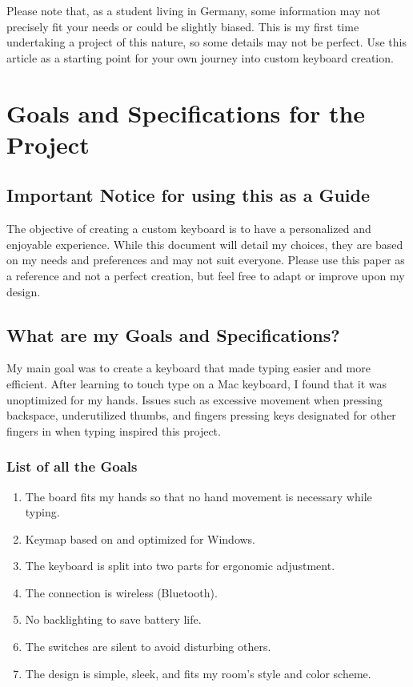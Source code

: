 \documentclass[a4paper,12pt]{article}
\begin{document}
Please note that, as a student living in Germany, some information may not precisely fit your needs or could be slightly biased. This is my first time undertaking a project of this nature, so some details may not be perfect. Use this article as a starting point for your own journey into custom keyboard creation.

\pagebreak

\section{Goals and Specifications for the Project}

\subsection{Important Notice for using this as a Guide}
The objective of creating a custom keyboard is to have a personalized and enjoyable experience. While this document will detail my choices, they are based on my needs and preferences and may not suit everyone. Please use this paper as a reference and not a perfect creation, but feel free to adapt or improve upon my design.

\subsection{What are my Goals and Specifications?}
My main goal was to create a keyboard that made typing easier and more efficient. After learning to touch type on a Mac keyboard, I found that it was unoptimized for my hands. Issues such as excessive movement when pressing backspace, underutilized thumbs, and fingers pressing keys designated for other fingers in when typing inspired this project. 

\subsubsection{List of all the Goals}
\begin{enumerate}
    \item The board fits my hands so that no hand movement is necessary while typing.
    \item Keymap based on and optimized for Windows.
    \item The keyboard is split into two parts for ergonomic adjustment.
    \item The connection is wireless (Bluetooth).
    \item No backlighting to save battery life.
    \item The switches are silent to avoid disturbing others.
    \item The design is simple, sleek, and fits my room's style and color scheme.
\end{enumerate}
\end{document}
